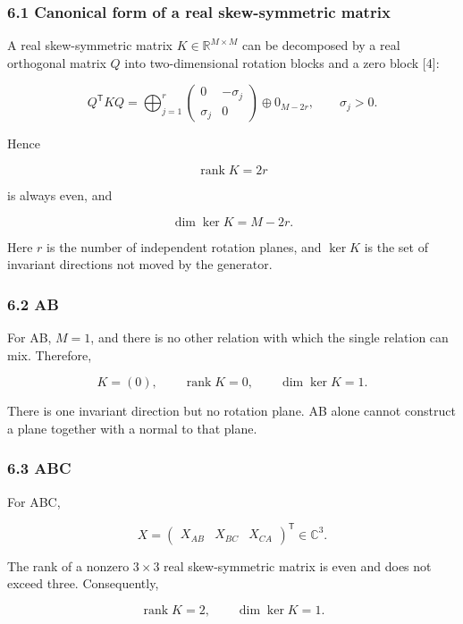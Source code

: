\documentclass[
  10pt,
  a4paper,
]{article}
\begin{document}
\subsubsection{6.1 Canonical form of a real skew-symmetric
matrix}\label{canonical-form-of-a-real-skew-symmetric-matrix}

A real skew-symmetric matrix \(K\in\mathbb R^{M\times M}\) can be
decomposed by a real orthogonal matrix \(Q\) into two-dimensional
rotation blocks and a zero block {[}4{]}:

\[
Q^{\mathsf T}KQ
=
\bigoplus_{j=1}^{r}
\begin{pmatrix}
0 & -\sigma_j\\
\sigma_j & 0
\end{pmatrix}
\oplus
0_{M-2r},
\qquad
\sigma_j>0.
\]

Hence

\[
\operatorname{rank}K=2r
\]

is always even, and

\[
\dim\ker K=M-2r.
\]

Here \(r\) is the number of independent rotation planes, and \(\ker K\)
is the set of invariant directions not moved by the generator.

\subsubsection{6.2 AB}\label{ab}

For AB, \(M=1\), and there is no other relation with which the single
relation can mix. Therefore,

\[
K=(0),
\qquad
\operatorname{rank}K=0,
\qquad
\dim\ker K=1.
\]

There is one invariant direction but no rotation plane. AB alone cannot
construct a plane together with a normal to that plane.

\subsubsection{6.3 ABC}\label{abc}

For ABC,

\[
X=
\begin{pmatrix}
X_{AB} & X_{BC} & X_{CA}
\end{pmatrix}^{\mathsf T}
\in\mathbb C^3.
\]

The rank of a nonzero \(3\times3\) real skew-symmetric matrix is even
and does not exceed three. Consequently,

\[
\operatorname{rank}K=2,
\qquad
\dim\ker K=1.
\]
\end{document}
